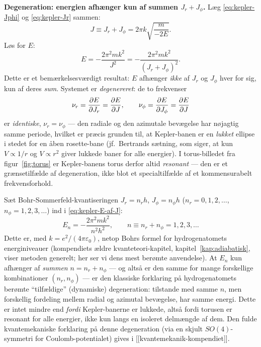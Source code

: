 \begin{eksempel}
\textbf{Degeneration: energien afhænger kun af summen $J_r+J_\phi$.}
Læg \eqref{eq:kepler-Jphi} og \eqref{eq:kepler-Jr} sammen:
\begin{equation}
  J \equiv J_r + J_\phi = 2\pi k\sqrt{\frac{m}{-2E}}.
\end{equation}
Løs for $E$:
\begin{equation}
  \boxed{E = -\frac{2\pi^2mk^2}{J^2} = -\frac{2\pi^2mk^2}{(J_r+J_\phi)^2}.}
  \label{eq:kepler-E-af-J}
\end{equation}
Dette er et bemærkelsesværdigt resultat: $E$ afhænger \emph{ikke} af
$J_r$ og $J_\phi$ hver for sig, kun af deres \emph{sum}. Systemet er
\emph{degenereret}: de to frekvenser
\begin{equation}
  \nu_r = \pdv{E}{J_r} = \pdv{E}{J}, \qquad
  \nu_\phi = \pdv{E}{J_\phi} = \pdv{E}{J}
\end{equation}
er \emph{identiske}, $\nu_r=\nu_\phi$ — den radiale og den azimutale
bevægelse har nøjagtig samme periode, hvilket er præcis grunden til,
at Kepler-banen er en \emph{lukket} ellipse i stedet for en åben
rosette-bane (jf.\ Bertrands sætning, som siger, at kun
$V\propto1/r$ og $V\propto r^2$ giver lukkede baner for alle
energier). I torus-billedet fra figur~\ref{fig:torus} er
Kepler-banens torus derfor altid \emph{resonant} — den er et
grænsetilfælde af degeneration, ikke blot et specialtilfælde af et
kommensurabelt frekvensforhold.

\begin{bemaerkning}
Sæt Bohr-Sommerfeld-kvantiseringen $J_r=n_rh$, $J_\phi=n_\phi h$
($n_r=0,1,2,\dots$, $n_\phi=1,2,3,\dots$) ind i \eqref{eq:kepler-E-af-J}:
\begin{equation}
  E_n = -\frac{2\pi^2mk^2}{n^2h^2}, \qquad n\equiv n_r+n_\phi = 1,2,3,\dots
\end{equation}
Dette er, med $k=e^2/(4\pi\varepsilon_0)$, netop Bohrs formel for
hydrogenatomets energiniveauer (kompendiets ældre kvanteteori-kapitel,
kapitel~\ref{kap:adiabatisk}, viser metoden generelt; her ser vi dens
mest berømte anvendelse). At $E_n$ kun afhænger af \emph{summen}
$n=n_r+n_\phi$ — og altså er den samme for mange forskellige
kombinationer $(n_r,n_\phi)$ — er den klassiske forklaring på
hydrogenatomets berømte ``tilfældige'' (dynamiske) degeneration:
tilstande med samme $n$, men forskellig fordeling mellem radial og
azimutal bevægelse, har samme energi. Dette er intet mindre end
\emph{fordi} Kepler-banerne er lukkede, altså fordi torusen er
resonant for alle energier, ikke kun langs en isoleret
delmængde af dem. Den fulde kvantemekaniske forklaring på denne
degeneration (via en skjult $SO(4)$-symmetri for Coulomb-potentialet)
gives i [[kvantemekanik-kompendiet]].
\end{bemaerkning}


\end{eksempel}
